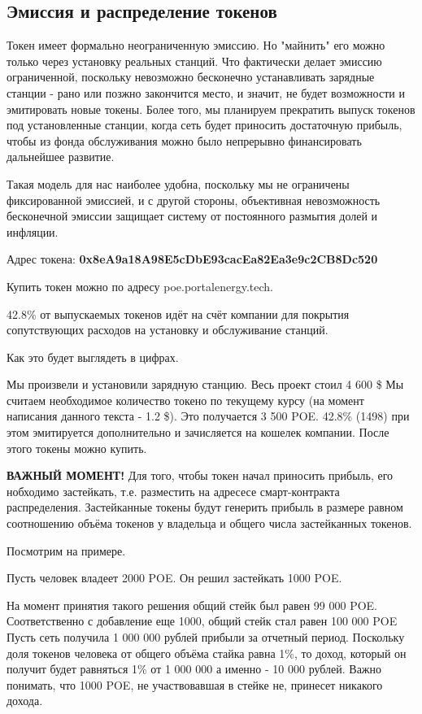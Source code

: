 \documentclass[a4paper,12pt]{report}
\newcommand{\contractAddress}{0x8eA9a18A98E5cDbE93cacEa82Ea3e9c2CB8Dc520}
\begin{document}
\subsection{Эмиссия и распределение токенов}

Токен имеет формально неограниченную эмиссию. Но "майнить" его можно только через установку реальных станций. Что фактически делает эмиссию ограниченной, поскольку невозможно бесконечно устанавливать зарядные станции - рано или позжно закончится место, и значит, не будет возможности и эмитировать новые токены. Более того, мы планируем прекратить выпуск токенов под установленные станции, когда сеть будет приносить достаточную прибыль, чтобы из фонда обслуживания можно было непрерывно финансировать дальнейшее развитие. 

Такая модель для нас наиболее удобна, поскольку мы не ограничены фиксированной эмиссией, и с другой стороны, объективная невозможность бесконечной эмиссии защищает систему от постоянного размытия долей и инфляции. 

 
Адрес токена:
\textbf{\contractAddress}

Купить токен можно по адресу poe.portalenergy.tech.  

42.8\% от выпускаемых токенов идёт на счёт компании для покрытия сопутствующих расходов на установку и обслуживание станций.

Как это будет выглядеть в цифрах.

Мы произвели и установили зарядную станцию. Весь проект стоил 4 600 \$ Мы считаем необходимое количество токено по текущему курсу (на момент написания данного текста - 1.2 \$). Это получается 3 500 POE. 42.8\% (1498) при этом эмитируется дополнительно и зачисляется на кошелек компании. После этого токены можно купить.

\textbf{ВАЖНЫЙ МОМЕНТ!} Для того, чтобы токен начал приносить прибыль, его нобходимо застейкать, т.е. разместить на адресесе смарт-контракта распределения. Застейканные токены будут генерить прибыль в размере равном соотношению объёма токенов у владельца и общего числа застейканных токенов. 

Посмотрим на примере.

Пусть человек владеет 2000 POE. Он решил застейкать 1000 POE.

На момент принятия такого решения общий стейк был равен 99 000 POE. Соответственно с добавление еще 1000, общий стейк стал равен 100 000 POE
Пусть сеть получила 1 000 000 рублей прибыли за отчетный период. Поскольку доля токенов человека от общего объёма стайка равна 1\%, то доход, который он получит будет равняться 1\% от 1 000 000 а именно - 10 000 рублей. Важно понимать, что 1000 POE, не участвовавшая в стейке не, принесет никакого дохода. 
\end{document}
